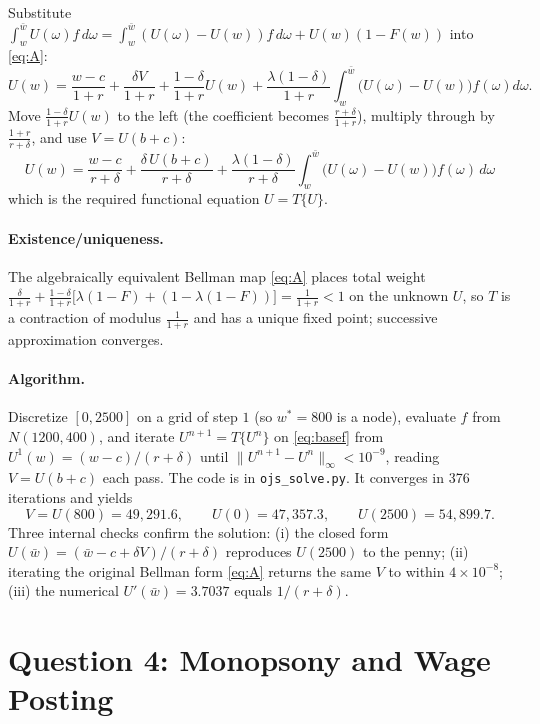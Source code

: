 \documentclass[11pt]{article}
\begin{document}
Substitute $\int_w^{\bar w}U(\omega)f\,d\omega=\int_w^{\bar w}(U(\omega)-U(w))f\,d\omega
+U(w)(1-F(w))$ into \eqref{eq:A}:
\[
U(w)=\frac{w-c}{1+r}+\frac{\delta V}{1+r}+\frac{1-\delta}{1+r}U(w)
  +\frac{\lambda(1-\delta)}{1+r}\!\int_w^{\bar w}\!\bigl(U(\omega)-U(w)\bigr)f(\omega)d\omega .
\]
Move $\tfrac{1-\delta}{1+r}U(w)$ to the left (the coefficient becomes
$\tfrac{r+\delta}{1+r}$), multiply through by $\tfrac{1+r}{r+\delta}$, and use
$V=U(b+c)$:
\begin{equation}\label{eq:basef}
\boxed{\;U(w)=\frac{w-c}{r+\delta}+\frac{\delta\,U(b+c)}{r+\delta}
   +\frac{\lambda(1-\delta)}{r+\delta}\!\int_{w}^{\bar w}\!\bigl(U(\omega)-U(w)\bigr)f(\omega)\,d\omega\;}
\end{equation}
which is the required functional equation $U=T\{U\}$.

\paragraph{Existence/uniqueness.} The algebraically equivalent Bellman map
\eqref{eq:A} places total weight
$\tfrac{\delta}{1+r}+\tfrac{1-\delta}{1+r}\bigl[\lambda(1-F)+(1-\lambda(1-F))\bigr]
=\tfrac{1}{1+r}<1$ on the unknown $U$, so $T$ is a contraction of modulus
$\tfrac1{1+r}$ and has a unique fixed point; successive approximation converges.

\paragraph{Algorithm.} Discretize $[0,2500]$ on a grid of step $1$ (so $w^*=800$
is a node), evaluate $f$ from $N(1200,400)$, and iterate
$U^{n+1}=T\{U^{n}\}$ on \eqref{eq:basef} from $U^{1}(w)=(w-c)/(r+\delta)$ until
$\|U^{n+1}-U^{n}\|_\infty<10^{-9}$, reading $V=U(b+c)$ each pass. The code is in
\texttt{ojs\_solve.py}. It converges in 376 iterations and yields
\[
V=U(800)=49{,}291.6,\qquad U(0)=47{,}357.3,\qquad U(2500)=54{,}899.7 .
\]
Three internal checks confirm the solution: (i) the closed form
$U(\bar w)=(\bar w-c+\delta V)/(r+\delta)$ reproduces $U(2500)$ to the penny;
(ii) iterating the original Bellman form \eqref{eq:A} returns the same $V$ to
within $4\times10^{-8}$; (iii) the numerical $U'(\bar w)=3.7037$ equals
$1/(r+\delta)$.

\section*{Question 4: Monopsony and Wage Posting}
\end{document}
